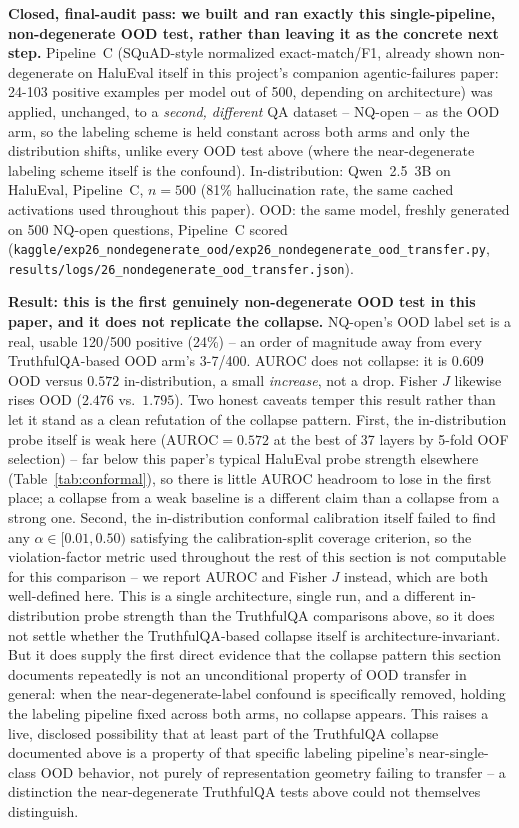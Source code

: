 \documentclass[10pt,twocolumn]{article}
\begin{document}
\textbf{Closed, final-audit pass: we built and ran exactly this
single-pipeline, non-degenerate OOD test, rather than leaving it as the
concrete next step.} Pipeline~C (SQuAD-style normalized exact-match/F1,
already shown non-degenerate on HaluEval itself in this project's
companion agentic-failures paper: 24-103 positive examples per model
out of 500, depending on architecture) was applied, unchanged, to a
\emph{second, different} QA dataset -- NQ-open -- as the OOD arm, so the
labeling scheme is held constant across both arms and only the
distribution shifts, unlike every OOD test above (where the
near-degenerate labeling scheme itself is the confound). In-distribution:
Qwen~2.5~3B on HaluEval, Pipeline~C, $n=500$ (81\% hallucination rate,
the same cached activations used throughout this paper). OOD: the same
model, freshly generated on 500 NQ-open questions, Pipeline~C scored
(\texttt{kaggle/exp26\_nondegenerate\_ood/exp26\_nondegenerate\_ood\_transfer.py},
\texttt{results/logs/26\_nondegenerate\_ood\_transfer.json}).

\textbf{Result: this is the first genuinely non-degenerate OOD test in
this paper, and it does not replicate the collapse.} NQ-open's OOD label
set is a real, usable 120/500 positive (24\%) -- an order of magnitude
away from every TruthfulQA-based OOD arm's 3-7/400. AUROC does not
collapse: it is $0.609$ OOD versus $0.572$ in-distribution, a small
\emph{increase}, not a drop. Fisher $J$ likewise rises OOD ($2.476$ vs.\
$1.795$). Two honest caveats temper this result rather than let it stand
as a clean refutation of the collapse pattern. First, the in-distribution
probe itself is weak here ($\text{AUROC}=0.572$ at the best of 37
layers by 5-fold OOF selection) -- far below this paper's typical
HaluEval probe strength elsewhere (Table~\ref{tab:conformal}), so there
is little AUROC headroom to lose in the first place; a collapse from a
weak baseline is a different claim than a collapse from a strong one.
Second, the in-distribution conformal calibration itself failed to find
any $\alpha\in[0.01,0.50)$ satisfying the calibration-split coverage
criterion, so the violation-factor metric used throughout the rest of
this section is not computable for this comparison -- we report AUROC
and Fisher $J$ instead, which are both well-defined here. This is a
single architecture, single run, and a different in-distribution probe
strength than the TruthfulQA comparisons above, so it does not settle
whether the TruthfulQA-based collapse itself is architecture-invariant.
But it does supply the first direct evidence that the collapse pattern
this section documents repeatedly is not an unconditional property of
OOD transfer in general: when the near-degenerate-label confound is
specifically removed, holding the labeling pipeline fixed across both
arms, no collapse appears. This raises a live, disclosed possibility
that at least part of the TruthfulQA collapse documented above is a
property of that specific labeling pipeline's near-single-class OOD
behavior, not purely of representation geometry failing to transfer --
a distinction the near-degenerate TruthfulQA tests above could not
themselves distinguish.
\end{document}

